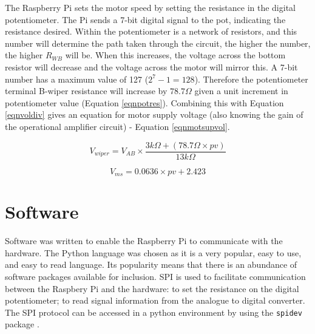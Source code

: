 \documentclass[twoside,a4]{report}
\def\br{\newline \newline \noindent}
\begin{document}
	
	\noindent
	The Raspberry Pi sets the motor speed by setting the resistance in the digital potentiometer. The Pi sends a 7-bit digital signal to the pot, indicating the resistance desired. Within the potentiometer is a network of resistors, and this number will determine the path taken through the circuit, the higher the number, the higher \(R_{WB}\) will be. When this increases, the voltage across the bottom resistor will decrease and the voltage across the motor will mirror this.\br
	A 7-bit number has a maximum value of 127 ($2^7 - 1 = 128$). Therefore the potentiometer terminal B-wiper resistance will increase by $78.7 \Omega$ given a unit increment in potentiometer value (Equation \ref{eqnpotres}). Combining this with Equation \ref{eqnvoldiv} gives an equation for motor supply voltage (also knowing the gain of the operational amplifier circuit) - Equation \ref{eqnmotsupvol}.
	
	\begin{equation}
	V_{wiper} = V_{AB}\times \frac{3k\Omega + \left(78.7\Omega \times pv\right)}{13k\Omega}
	\label{eqnpotres}
	\end{equation}
	
	
	\begin{equation}
	V_{ms} = 0.0636 \times pv + 2.423
	\label{eqnmotsupvol}
	\end{equation}
	

	\section{Software} %
	Software was written to enable the Raspberry Pi to communicate with the hardware. The Python language was chosen as it is a very popular, easy to use, and easy to read language. Its popularity means that there is an abundance of software packages available for inclusion. SPI is used to facilitate communication between the Raspbery Pi and the hardware: to set the resistance on the digital potentiometer; to read signal information from the analogue to digital converter. The SPI protocol can be accessed in a python environment by using the \texttt{spidev} package \cite{srcspidev}. \newline
	
\end{document}
